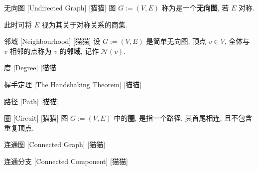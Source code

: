 \documentclass[UTF8]{ctexart}
\begin{document}
            \begin{dfn}
                []
                {无向图}
                [Undirected Graph]
                [猫猫]
                图 \(G:=(V,E)\) 称为是一个\textbf{无向图}, 若 \(E\) 对称. 

                此时可将 \(E\) 视为其关于对称关系的商集. 
            \end{dfn}
            
            \begin{dfn}
                []
                {邻域}
                [Neighbourhood]
                [猫猫]
                设 \(G:=(V,E)\) 是简单无向图, 顶点 \(v\in V\), 全体与 \(v\) 相邻的点称为 \(v\) 的\textbf{邻域}, 记作 \(\mathcal{N}(v)\). 
            \end{dfn}
            
            \begin{dfn}
                []
                {度}
                [Degree]
                [猫猫]
            \end{dfn}
            
            \begin{ppt}
                []
                {握手定理}
                [The Handshaking Theorem]
                [猫猫]
            \end{ppt}
            
            \begin{dfn}
                []
                {路径}
                [Path]
                [猫猫]
            \end{dfn}
            
            \begin{dfn}
                []
                {圈}
                [Circuit]
                [猫猫]
                图 \(G:=(V,E)\) 中的\textbf{圈}, 是指一个路径, 其首尾相连, 且不包含重复顶点. 
            \end{dfn}
            
            \begin{dfn}
                []
                {连通图}
                [Connected Graph]
                [猫猫]
            \end{dfn}
            
            \begin{dfn}
                []
                {连通分支}
                [Connected Component]
                [猫猫]
            \end{dfn}
\end{document}
